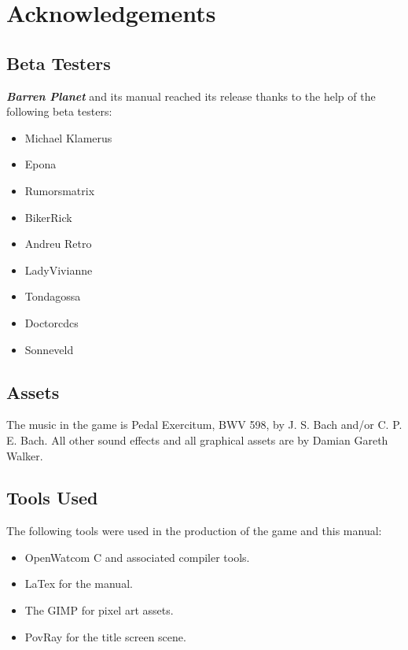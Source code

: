 %
%
%
%

\chapter{Acknowledgements}

\section{Beta Testers}

\noindent
{\bf \it Barren Planet} and its manual reached its release thanks to the help of the following beta testers:

\begin{itemize}
\item Michael Klamerus
\item Epona
\item Rumorsmatrix
\item BikerRick
\item Andreu Retro
\item LadyVivianne
\item Tondagossa
\item Doctorcdcs
\item Sonneveld
\end{itemize}

\section{Assets}

\noindent
The music in the game is Pedal Exercitum, BWV 598, by J. S. Bach and/or C. P. E. Bach. All other sound effects and all graphical assets are by Damian Gareth Walker.

\section {Tools Used}

\noindent
The following tools were used in the production of the game and this manual:

\begin{itemize}
\item OpenWatcom C and associated compiler tools.
\item LaTex for the manual.
\item The GIMP for pixel art assets.
\item PovRay for the title screen scene.
\end{itemize}
